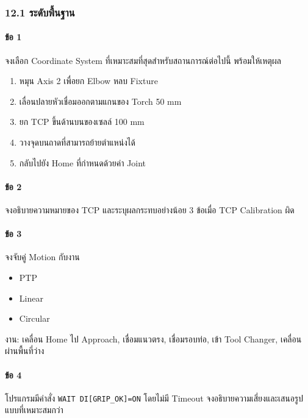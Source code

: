\subsubsection{12.1 ระดับพื้นฐาน}

\paragraph{ข้อ 1}

จงเลือก Coordinate System ที่เหมาะสมที่สุดสำหรับสถานการณ์ต่อไปนี้ พร้อมให้เหตุผล

\begin{enumerate}
    \item หมุน Axis 2 เพื่อยก Elbow หลบ Fixture
    \item เลื่อนปลายหัวเชื่อมออกตามแกนของ Torch 50 mm
    \item ยก TCP ขึ้นด้านบนของเซลล์ 100 mm
    \item วางจุดบนถาดที่สามารถย้ายตำแหน่งได้
    \item กลับไปยัง Home ที่กำหนดด้วยค่า Joint
\end{enumerate}

\paragraph{ข้อ 2}

จงอธิบายความหมายของ TCP และระบุผลกระทบอย่างน้อย 3 ข้อเมื่อ TCP Calibration ผิด

\paragraph{ข้อ 3}

จงจับคู่ Motion กับงาน

\begin{itemize}
    \item PTP
    \item Linear
    \item Circular
\end{itemize}

งาน: เคลื่อน Home ไป Approach, เชื่อมแนวตรง, เชื่อมรอบท่อ, เข้า Tool Changer, เคลื่อนผ่านพื้นที่ว่าง

\paragraph{ข้อ 4}

โปรแกรมมีคำสั่ง \texttt{WAIT DI[GRIP\_OK]=ON} โดยไม่มี Timeout จงอธิบายความเสี่ยงและเสนอรูปแบบที่เหมาะสมกว่า

